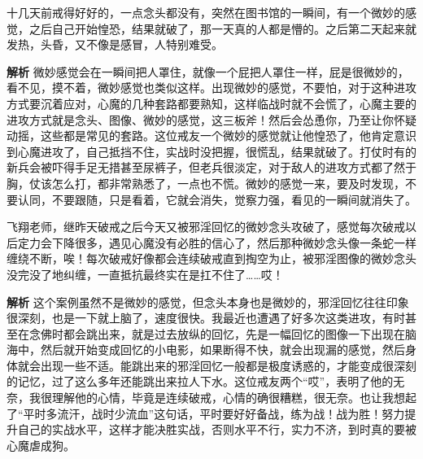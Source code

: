 \begin{case}[如何战胜微妙的感觉]
    十几天前戒得好好的，一点念头都没有，突然在图书馆的一瞬间，有一个微妙的感觉，之后自己开始惶恐，结果就破了，那一天真的人都是懵的。之后第二天起来就发热，头昏，又不像是感冒，人特别难受。

    \textbf{解析} 微妙感觉会在一瞬间把人罩住，就像一个屁把人罩住一样，屁是很微妙的，看不见，摸不着，微妙感觉也类似这样。出现微妙的感觉，不要怕，对于这种进攻方式要沉着应对，心魔的几种套路都要熟知，这样临战时就不会慌了，心魔主要的进攻方式就是念头、图像、微妙的感觉，这三板斧！然后会怂恿你，乃至让你怀疑动摇，这些都是常见的套路。这位戒友一个微妙的感觉就让他惶恐了，他肯定意识到心魔进攻了，自己抵挡不住，实战时没把握，很慌乱，结果就破了。打仗时有的新兵会被吓得手足无措甚至尿裤子，但老兵很淡定，对于敌人的进攻方式都了然于胸，仗该怎么打，都非常熟悉了，一点也不慌。微妙的感觉一来，要及时发现，不要认同，不要跟随，只是看着，它就会消失，觉察力强，看见的一瞬间就消失了。
\end{case}

\begin{case}[如何战胜微妙的感觉]
    飞翔老师，继昨天破戒之后今天又被邪淫回忆的微妙念头攻破了，感觉每次破戒以后定力会下降很多，遇见心魔没有必胜的信心了，然后那种微妙念头像一条蛇一样缠绕不断，唉！每次破戒好像都会连续破戒直到掏空为止，被邪淫图像的微妙念头没完没了地纠缠，一直抵抗最终实在是扛不住了……哎！

    \textbf{解析} 这个案例虽然不是微妙的感觉，但念头本身也是微妙的，邪淫回忆往往印象很深刻，也是一下就上脑了，速度很快。我最近也遭遇了好多次这类进攻，有时甚至在念佛时都会跳出来，就是过去放纵的回忆，先是一幅回忆的图像一下出现在脑海中，然后就开始变成回忆的小电影，如果断得不快，就会出现漏的感觉，然后身体就会出现一些不适。能跳出来的邪淫回忆一般都是极度诱惑的，才能变成很深刻的记忆，过了这么多年还能跳出来拉人下水。这位戒友两个“哎”，表明了他的无奈，我很理解他的心情，毕竟是连续破戒，心情的确很糟糕，很无奈。也让我想起了“平时多流汗，战时少流血”这句话，平时要好好备战，练为战！战为胜！努力提升自己的实战水平，这样才能决胜实战，否则水平不行，实力不济，到时真的要被心魔虐成狗。
\end{case}

